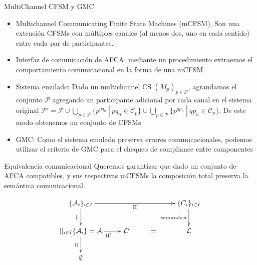 \documentclass[10pt,xcolor={table,dvipsnames},t]{beamer}
\begin{document}
\begin{frame}{MultiChannel CFSM y GMC}
\begin{itemize}
    \item Multichannel Communicating Finite State Machines (mCFSM). Son una extensión CFSMs con múltiples canales (al menos dos, uno en cada sentido) entre cada par de participantes.
    
    \item Interfaz de comunicación de AFCA: mediante un procedimiento extraemos el comportamiento comunicacional en la forma de una mCFSM
    
    \item Sistema emulado: Dado un multichannel CS $(M_p)_{p \in \mathcal{P}}$, agrandamos el conjunto $ \mathcal{P}$ agregando un participante adicional por cada canal en el sistema original $\mathcal{P}'=\mathcal{P} \cup \bigcup_{p \in \mathcal{P}} \{p^{pq_n} \ | \ pq_n \in \mathcal{C}_p \} \cup \bigcup_{p \in \mathcal{P}} \{p^{qp_n} \ | \ qp_n \in \mathcal{C}_p \}$. De este modo obtenemos un conjunto de CFSMs
    
    \item GMC: Como el sistema emulado preserva errores comunicacionales, podemos utilizar el criterio de GMC para el chequeo de compliance entre componentes
\end{itemize}

\end{frame}

\begin{frame}{Equivalencia comunicacional}
Queremos garantizar que dado un conjunto de AFCA compatibles, y sus respectivas mCFSMs la composición total preserva la semántica comunicacional.  

\begin{figure}[H]
$$
\xymatrix{   
	\{\mathcal{A}_i\}_{i \in I} \ar[rrr]_{\Pi} \ar[d]_{||} & & & \{C_i\}_{i \in I}  \ar[d]_{semantica}  \\
	  {||_{i \in I}\{\mathcal{A}_i\}= \mathcal{A}} \ar[r]_{\ \ \ \ \Pi'} \ar[d]_{\Pi} & \mathcal{L}' & = & {\mathcal{L}}  \\
	  \emptyset
}
$$
\end{figure}
    
\end{frame}
\end{document}

